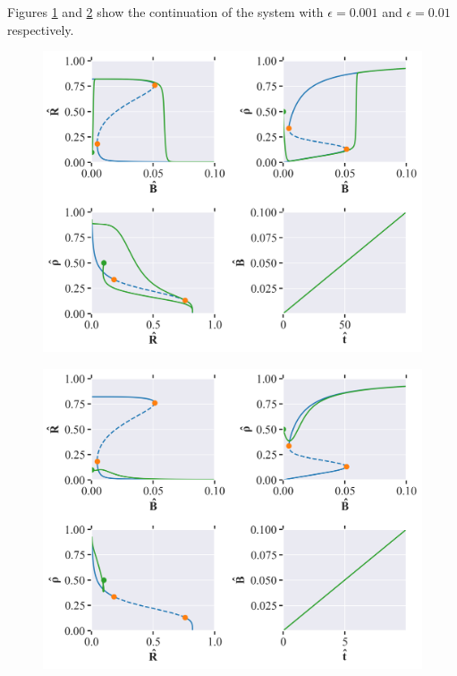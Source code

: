 Figures \ref{fig:cell_biology_ex3_small} and \ref{fig:cell_biology_ex3_big} show the continuation of the system with $\epsilon = 0.001$ and $\epsilon = 0.01$ respectively.
\begin{figure}[H]
    \centering
    \includegraphics[width= \textwidth]{figures/cell_biology_R(0)=0.1_rho(0)=0.5_B(0)_0.0001_eps=0.001_Bmax=0.04.png}
    \caption{}
    \label{fig:cell_biology_ex3_small}
\end{figure}

\begin{figure}[H]
    \centering
    \includegraphics[width= \textwidth]{figures/cell_biology_R(0)=0.1_rho(0)=0.5_B(0)_0.0001_eps=0.01_Bmax=0.04.png}
    \caption{}
    \label{fig:cell_biology_ex3_big}
\end{figure}

